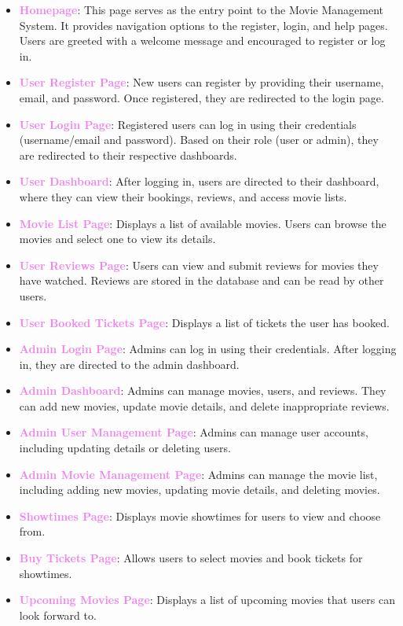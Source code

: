 \documentclass[a4paper,12pt]{article}  %
\renewcommand{\textbf}[1]{\textcolor{violet}{\bfseries #1}}
\begin{document}
\begin{itemize}
    \item \textbf{Homepage}: This page serves as the entry point to the Movie Management System. It provides navigation options to the register, login, and help pages. Users are greeted with a welcome message and encouraged to register or log in.
    \item \textbf{User Register Page}: New users can register by providing their username, email, and password. Once registered, they are redirected to the login page.
    \item \textbf{User Login Page}: Registered users can log in using their credentials (username/email and password). Based on their role (user or admin), they are redirected to their respective dashboards.
    \item \textbf{User Dashboard}: After logging in, users are directed to their dashboard, where they can view their bookings, reviews, and access movie lists.
    \item \textbf{Movie List Page}: Displays a list of available movies. Users can browse the movies and select one to view its details.
    \item \textbf{User Reviews Page}: Users can view and submit reviews for movies they have watched. Reviews are stored in the database and can be read by other users.
    \item \textbf{User Booked Tickets Page}: Displays a list of tickets the user has booked.
    \item \textbf{Admin Login Page}: Admins can log in using their credentials. After logging in, they are directed to the admin dashboard.
    \item \textbf{Admin Dashboard}: Admins can manage movies, users, and reviews. They can add new movies, update movie details, and delete inappropriate reviews.
    \item \textbf{Admin User Management Page}: Admins can manage user accounts, including updating details or deleting users.
    \item \textbf{Admin Movie Management Page}: Admins can manage the movie list, including adding new movies, updating movie details, and deleting movies.
    \item \textbf{Showtimes Page}: Displays movie showtimes for users to view and choose from.
    \item \textbf{Buy Tickets Page}: Allows users to select movies and book tickets for showtimes.
    \item \textbf{Upcoming Movies Page}: Displays a list of upcoming movies that users can look forward to.
\end{itemize}
\end{document}
